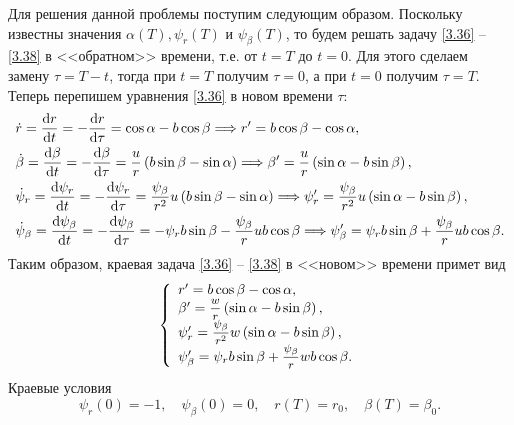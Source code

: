 \documentclass[a4paper,12pt, openany]{book}
\theoremstyle{plain} %
\theoremstyle{definition} %
\theoremstyle{remark} %
\newcommand{\dd}{\mathrm{d}}
\numberwithin{equation}{chapter}
\begin{document}
{Для решения данной проблемы поступим следующим образом. Поскольку известны значения $\alpha(T), \psi_r(T)$ и $\psi_\beta(T)$, то будем решать задачу \eqref{3.36} -- \eqref{3.38} в <<обратном>> времени, т.е. от $t=T$ до $t=0$. Для этого сделаем замену $\tau = T-t$, тогда при $t=T$ получим $\tau = 0$, а при $t=0$ получим $\tau =T$. Теперь перепишем уравнения \eqref{3.36} в новом времени $\tau$:
\[
\begin{gathered}
  \dot r = \frac{{\dd r}}
{{\dd t}} =  - \frac{{\dd r}}
{{\dd \tau }} = \cos \alpha  - b\cos \beta  \Longrightarrow r' = b\cos \beta  - \cos \alpha , \hfill \\
  \dot \beta  = \frac{{\dd\beta }}
{{\dd t}} =  - \frac{{\dd\beta }}
{{\dd\tau }} = \frac{u}
{r}\left( {b\sin \beta  - \sin \alpha } \right) \Longrightarrow \beta ' = \frac{u}
{r}\left( {\sin \alpha  - b\sin \beta } \right), \hfill \\
  \dot \psi _r  = \frac{{\dd\psi _r }}
{{\dd t}} =  - \frac{{\dd\psi _r }}
{{\dd\tau }} = \frac{{\psi _\beta  }}
{{r^2 }}u\left( {b\sin \beta  - \sin \alpha } \right) \Longrightarrow \psi '_r  = \frac{{\psi _\beta  }}
{{r^2 }}u\left( {\sin \alpha  - b\sin \beta } \right), \hfill \\
  \dot \psi _\beta   = \frac{{\dd\psi _\beta  }}
{{\dd t}} =  - \frac{{\dd \psi _\beta  }}
{{\dd\tau }} =  - \psi _r b\sin \beta  - \frac{{\psi _\beta  }}
{r}ub\cos \beta  \Longrightarrow \psi '_\beta   = \psi _r b\sin \beta  + \frac{{\psi _\beta  }}
{r}ub\cos \beta. \hfill \\ 
\end{gathered} 
\]
Таким образом, краевая задача \eqref{3.36} -- \eqref{3.38} в <<новом>> времени примет вид
\begin{equation}\label{3.39}
\left\{ {\begin{array}{*{20}l}
   {r' = b\cos \beta  - \cos \alpha ,}  \\
   {\beta ' = \mfrac{w}
{r}\left( {\sin \alpha  - b\sin \beta } \right),}  \\
   {\psi '_r  = \mfrac{{\psi _\beta  }}
{{r^2 }}w\left( {\sin \alpha  - b\sin \beta } \right),}  \\
   {\psi '_\beta   = \psi _r b\sin \beta  + \mfrac{{\psi _\beta  }}
{r}wb\cos \beta .}  \\
 \end{array} } \right.
\end{equation}
Краевые условия 
\begin{equation}\label{3.40}
\psi _r \left( 0 \right) =  - 1, \quad \psi _\beta  \left( 0 \right) = 0, \quad r\left( T \right) = r_0, \quad \beta \left( T \right) = \beta _0 .

\end{equation}}
\end{document}
